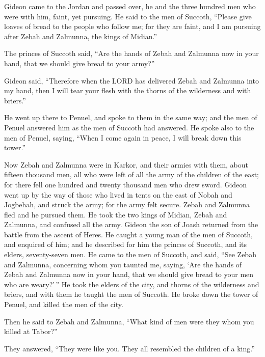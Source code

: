  Gideon came to the Jordan and passed over, he and the three
hundred men who were with him, faint, yet pursuing.  He said
to the men of Succoth, ``Please give loaves of bread to the people who
follow me; for they are faint, and I am pursuing after Zebah and
Zalmunna, the kings of Midian.''

 The princes of Succoth said, ``Are the hands of Zebah and
Zalmunna now in your hand, that we should give bread to your army?''

 Gideon said, ``Therefore when the LORD has delivered Zebah
and Zalmunna into my hand, then I will tear your flesh with the thorns
of the wilderness and with briers.''

 He went up there to Penuel, and spoke to them in the same
way; and the men of Penuel answered him as the men of Succoth had
answered.  He spoke also to the men of Penuel, saying,
``When I come again in peace, I will break down this tower.''

 Now Zebah and Zalmunna were in Karkor, and their armies
with them, about fifteen thousand men, all who were left of all the army
of the children of the east; for there fell one hundred and twenty
thousand men who drew sword.  Gideon went up by the way of
those who lived in tents on the east of Nobah and Jogbehah, and struck
the army; for the army felt secure.  Zebah and Zalmunna
fled and he pursued them. He took the two kings of Midian, Zebah and
Zalmunna, and confused all the army.  Gideon the son of
Joash returned from the battle from the ascent of Heres. 
He caught a young man of the men of Succoth, and enquired of him; and he
described for him the princes of Succoth, and its elders, seventy-seven
men.  He came to the men of Succoth, and said, ``See Zebah
and Zalmunna, concerning whom you taunted me, saying, `Are the hands of
Zebah and Zalmunna now in your hand, that we should give bread to your
men who are weary?'\,''  He took the elders of the city,
and thorns of the wilderness and briers, and with them he taught the men
of Succoth.  He broke down the tower of Penuel, and killed
the men of the city.

 Then he said to Zebah and Zalmunna, ``What kind of men
were they whom you killed at Tabor?''

They answered, ``They were like you. They all resembled the children of
a king.''

